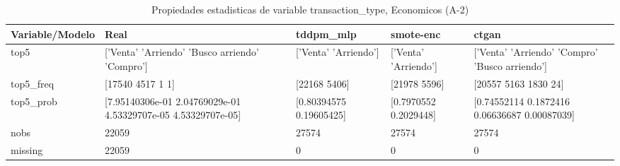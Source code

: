 \begin{table}[H]
\centering
\fontsize{8}{14}\selectfont
\caption{Propiedades  estadisticas de variable transaction\_type, Economicos (A-2)}
\label{table-stats-economicos-a-2-transaction_type}
\begin{tabular}{|l|m{10em}|m{10em}|m{10em}|m{10em}|}
\hline
 \rowcolor[gray]{0.8}
Variable/Modelo & Real & tddpm\_mlp & smote-enc & ctgan \\
\hline top5 & ['Venta' 'Arriendo' 'Busco arriendo' 'Compro'] & ['Venta' 'Arriendo'] & ['Venta' 'Arriendo'] & ['Venta' 'Arriendo' 'Compro' 'Busco arriendo'] \\
\hline top5\_freq & [17540  4517     1     1] & [22168  5406] & [21978  5596] & [20557  5163  1830    24] \\
\hline top5\_prob & [7.95140306e-01 2.04769029e-01 4.53329707e-05 4.53329707e-05] & [0.80394575 0.19605425] & [0.7970552 0.2029448] & [0.74552114 0.1872416  0.06636687 0.00087039] \\
\hline nobs & 22059 & 27574 & 27574 & 27574 \\
\hline missing & 22059 & 0 & 0 & 0 \\
\hline
\end{tabular}
\end{table}
